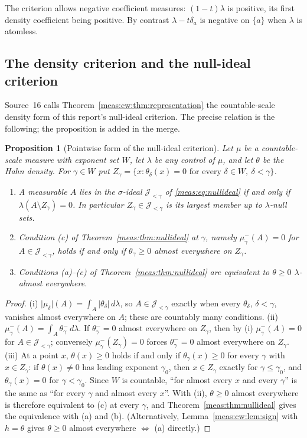 \documentclass[11pt]{article}
\numberwithin{equation}{section}
\newtheorem{proposition}[theorem]{Proposition}
\theoremstyle{definition}
\theoremstyle{remark}
\newcommand{\abs}[1]{\lvert#1\rvert}
\begin{document}
The criterion allows negative coefficient measures: $(1-t)\lambda$ is
positive, its first density coefficient being positive. By contrast
$\lambda-t\delta_a$ is negative on $\{a\}$ when $\lambda$ is atomless.

\subsection{The density criterion and the null-ideal criterion}
\label{meas:cw:sub:nullideal}

Source~16 calls Theorem~\ref{meas:cw:thm:representation} the countable-scale
density form of this report's null-ideal criterion. The precise relation is
the following; the proposition is added in the merge.

\begin{proposition}[Pointwise form of the null-ideal criterion]
\label{meas:cw:prop:nullideal}
Let $\mu$ be a countable-scale measure with exponent set $W$, let $\lambda$ be any
control of $\mu$, and let $\theta$ be the Hahn density. For $\gamma\in W$ put
$Z_\gamma=\{x:\theta_\delta(x)=0\text{ for every }\delta\in W,\ \delta<\gamma\}$.
\begin{enumerate}[label=(\roman*)]
\item A measurable $A$ lies in the $\sigma$-ideal $\mathcal J_{<\gamma}$ of
\eqref{meas:eq:nullideal} if and only if $\lambda(A\setminus Z_\gamma)=0$. In
particular $Z_\gamma\in\mathcal J_{<\gamma}$ is its largest member up to
$\lambda$-null sets.
\item Condition (c) of Theorem~\ref{meas:thm:nullideal} at $\gamma$, namely
$\mu_\gamma^-(A)=0$ for $A\in\mathcal J_{<\gamma}$, holds if and only if
$\theta_\gamma\ge0$ almost everywhere on $Z_\gamma$.
\item Conditions (a)--(c) of Theorem~\ref{meas:thm:nullideal} are equivalent to
$\theta\ge0$ $\lambda$-almost everywhere.
\end{enumerate}
\end{proposition}
\begin{proof}
(i) $\abs{\mu_\delta}(A)=\int_A\abs{\theta_\delta}\,d\lambda$, so $A\in\mathcal
J_{<\gamma}$ exactly when every $\theta_\delta$, $\delta<\gamma$, vanishes almost
everywhere on $A$; these are countably many conditions. (ii)
$\mu_\gamma^-(A)=\int_A\theta_\gamma^-\,d\lambda$. If $\theta_\gamma^-=0$ almost
everywhere on $Z_\gamma$, then by (i) $\mu_\gamma^-(A)=0$ for $A\in\mathcal
J_{<\gamma}$; conversely $\mu_\gamma^-(Z_\gamma)=0$ forces $\theta_\gamma^-=0$ almost
everywhere on $Z_\gamma$. (iii) At a point $x$, $\theta(x)\ge0$ holds if and only
if $\theta_\gamma(x)\ge0$ for every $\gamma$ with $x\in Z_\gamma$: if $\theta(x)\ne0$
has leading exponent $\gamma_0$, then $x\in Z_\gamma$ exactly for
$\gamma\le\gamma_0$, and $\theta_\gamma(x)=0$ for $\gamma<\gamma_0$. Since $W$ is countable,
``for almost every $x$ and every $\gamma$'' is the same as ``for every $\gamma$ and
almost every $x$''. With (ii), $\theta\ge0$ almost everywhere is therefore
equivalent to (c) at every $\gamma$, and Theorem~\ref{meas:thm:nullideal} gives
the equivalence with (a) and (b). (Alternatively, Lemma~\ref{meas:cw:lem:sign}
with $h=\theta$ gives $\theta\ge0$ almost everywhere $\Leftrightarrow$ (a) directly.)
\end{proof}
\end{document}
